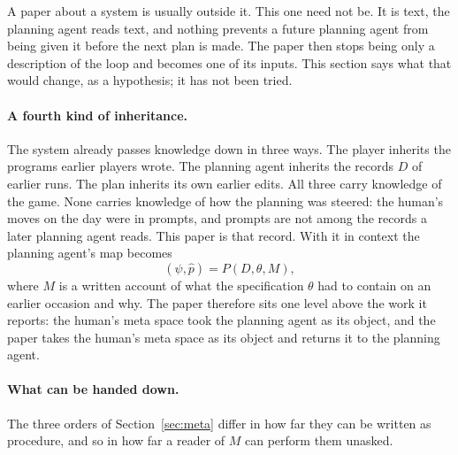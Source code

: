 \documentclass[11pt,a4paper]{article}
\begin{document}
A paper about a system is usually outside it. This one need not be. It is text, the planning agent reads text, and nothing prevents a future planning agent from being given it before the next plan is made. The paper then stops being only a description of the loop and becomes one of its inputs. This section says what that would change, as a hypothesis; it has not been tried.

\paragraph{A fourth kind of inheritance.} The system already passes knowledge down in three ways. The player inherits the programs earlier players wrote. The planning agent inherits the records $D$ of earlier runs. The plan inherits its own earlier edits. All three carry knowledge of the game. None carries knowledge of how the planning was steered: the human's moves on the day were in prompts, and prompts are not among the records a later planning agent reads. This paper is that record. With it in context the planning agent's map becomes
\[
(\psi, \hat p) = P(D, \theta, M),
\]
where $M$ is a written account of what the specification $\theta$ had to contain on an earlier occasion and why. The paper therefore sits one level above the work it reports: the human's meta space took the planning agent as its object, and the paper takes the human's meta space as its object and returns it to the planning agent.

\paragraph{What can be handed down.} The three orders of Section~\ref{sec:meta} differ in how far they can be written as procedure, and so in how far a reader of $M$ can perform them unasked.
\end{document}
